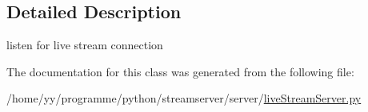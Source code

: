 \subsection{Detailed Description}
\begin{DoxyVerb}listen for live stream connection\end{DoxyVerb}
 

The documentation for this class was generated from the following file:\begin{DoxyCompactItemize}
\item 
/home/yy/programme/python/streamserver/server/\hyperlink{liveStreamServer_8py}{liveStreamServer.py}\end{DoxyCompactItemize}
